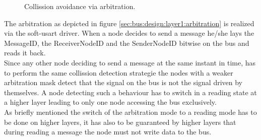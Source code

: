 \begin{figure}[h]
\begin{center}
\end{center}

\caption{Collission avoidance via arbitration.}
\end{figure}

The arbitration as depicted in figure \ref{sec:bus:design:layer1:arbitration} is realized via the soft-usart driver. 
When a node decides to send a message he/she lays the MessageID, the ReceiverNodeID and the SenderNodeID bitwise on the bus and reads it back.\\

Since any other node deciding to send a message at the same instant in time, has to perform the same collission detection strategie the nodes with a weaker arbitration mask detect that the signal on the bus is not the signal driven by themselves.
A node detecting such a behaviour has to switch in a reading state at a higher layer leading to only one node accessing the bus exclusively.\\

As briefly mentioned the switch of the arbitration mode to a reading mode has to be done on higher layers, it has also to be guaranteed by higher layers that during reading a message the node must not write data to the bus.
